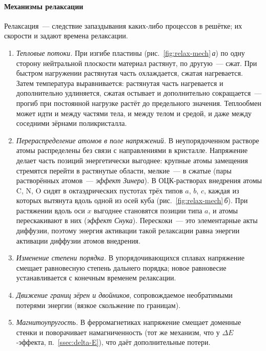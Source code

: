 \paragraph{Механизмы релаксации}
Релаксация~— следствие запаздывания каких-либо процессов в решётке; их
скорости и задают времена релаксации.
\begin{enumerate}
\item \emph{Тепловые потоки.} При изгибе пластины
(рис.~\ref{fig:relax-mech}\,\textit{а}) по одну сторону нейтральной
плоскости материал растянут, по другую~— сжат. При быстром нагружении
растянутая часть охлаждается, сжатая нагревается. Затем температура
выравнивается: растянутая часть нагревается и дополнительно удлиняется,
сжатая остывает и дополнительно сокращается~— прогиб при постоянной
нагрузке растёт до предельного значения. Теплообмен может идти и между
частями тела, и между телом и средой, и даже между соседними зёрнами
поликристалла.
\item \emph{Перераспределение атомов в поле напряжений.} В неупорядоченном
растворе атомы распределены без связи с направлениями в кристалле.
Напряжение делает часть позиций энергетически выгоднее: крупные атомы
замещения стремятся перейти в растянутые области, мелкие~— в сжатые
(пары растворённых атомов~— \emph{эффект Зинера}). В ОЦК-растворах
внедрения атомы C, N, O сидят в октаэдрических пустотах трёх типов
$a$, $b$, $c$, каждая из которых вытянута вдоль одной из осей куба
(рис.~\ref{fig:relax-mech}\,\textit{б}). При растяжении вдоль оси $x$
выгоднее становятся позиции типа $a$, и атомы перескакивают в них
(\emph{эффект Снука}). Перескоки~— это элементарные акты диффузии, поэтому
энергия активации такой релаксации равна энергии активации диффузии
атомов внедрения.
\item \emph{Изменение степени порядка.} В упорядочивающихся сплавах
напряжение смещает равновесную степень дальнего порядка; новое
равновесие устанавливается с конечным временем релаксации.
\item \emph{Движение границ зёрен и двойников}, сопровождаемое
необратимыми потерями энергии (вязкое скольжение по границам).
\item \emph{Магнитоупругость.} В ферромагнетиках напряжение смещает
доменные стенки и поворачивает намагниченность (тот же механизм, что у
$\Delta E$-эффекта, п.~\ref{ssec:delta-E}), что даёт дополнительные потери.
\end{enumerate}

